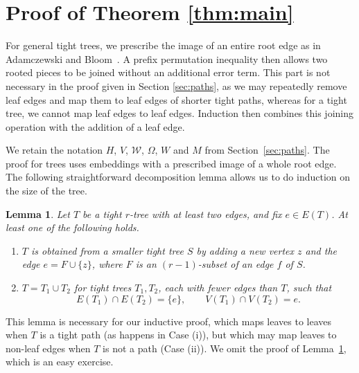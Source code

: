 \documentclass[11pt]{article}
\newtheorem{lemma}[theorem]{Lemma}
\theoremstyle{remark}
\numberwithin{equation}{section}
\newcommand{\Wcal}{\mathcal W}
\begin{document}
	\section{Proof of Theorem \ref{thm:main}}\label{sec:trees}
	
	For general tight trees, we prescribe the image of an entire root edge as in Adamczewski and Bloom~\cite[Appendix B.4]{Epoch}. A prefix permutation inequality then allows two rooted pieces to be joined
	without an additional error term. This part is not necessary in the proof given in Section \ref{sec:paths}, as we may repeatedly remove leaf edges and map them to leaf edges of shorter tight paths, whereas for a tight tree, we cannot map leaf edges to leaf edges.
	Induction then combines this joining
	operation with the addition of a leaf edge.
	
	
	We retain the notation $H$, $V$, $\Wcal$, $\Omega$, $W$ and $M$ from
	Section~\ref{sec:paths}. The proof for trees uses embeddings with a
	prescribed image of a whole root edge. 
	The following straightforward decomposition lemma allows us to do induction on the size of the tree.
	
	\begin{lemma}\label{lem:structure}
		Let $T$ be a tight $r$-tree with at least two edges, and fix
		$e\in E(T)$. At least one of the following holds.
		\begin{enumerate}[label=\textup{(\roman*)},leftmargin=*]
			\item\label{case:leaf}
			$T$ is obtained from a smaller tight tree $S$ by adding a new
			vertex $z$ and the edge $e=F\cup\{z\}$, where $F$ is an
			$(r-1)$-subset of an edge $f$ of $S$.
			\item\label{case:gluing}
			$T=T_1\cup T_2$ for tight trees $T_1,T_2$, each with fewer edges
			than $T$, such that
			\[
			E(T_1)\cap E(T_2)=\{e\},\qquad V(T_1)\cap V(T_2)=e.
			\]
		\end{enumerate}
	\end{lemma}
	
	This lemma is necessary for our inductive proof, which maps leaves to leaves when $T$ is a tight path (as happens in Case (i)), but which may map leaves to non-leaf edges when $T$ is not a path (Case (ii)). We omit the proof of Lemma~\ref{lem:structure}, which is an easy exercise.
	
\end{document}
